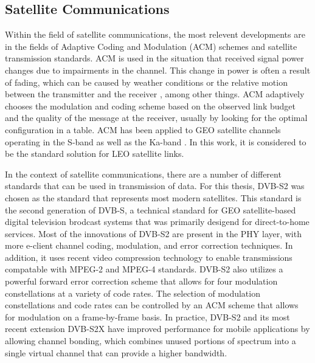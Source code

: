 \subsection{Satellite Communications}
\par Within the field of satellite communications, the most relevent developments are in the fields of Adaptive Coding and Modulation (ACM) schemes and satellite transmission standards.  ACM is used in the situation that received signal power changes due to impairments in the channel\cite{acm_explained}. This change in power is often a result of fading, which can be caused by weather conditions or the relative motion between the transmitter and the receiver \cite{paulo17}, among other things. ACM adaptively chooses the modulation and coding scheme based on the observed link budget and the quality of the message at the receiver, usually by looking for the optimal configuration in a table. ACM has been applied to GEO satellite channels operating in the S-band \cite{paulo18} as well as the Ka-band \cite{paulo19}. In this work, it is considered to be the standard solution for LEO satellite links.  
\par In the context of satellite communications, there are a number of different standards that can be used in transmission of data. For this thesis, DVB-S2 \cite{paulo21} was chosen as the standard that represents most modern satellites. This standard is the second generation of DVB-S, a technical standard for GEO satellite-based digital television brodcast systems that was primarily desigend for direct-to-home services. Most of the innovations of DVB-S2 are present in the PHY layer, with more e-client channel coding, modulation, and error correction techniques. In addition, it uses recent video compression technology to enable transmissions compatable with MPEG-2 and MPEG-4 standards. DVB-S2 also utilizes a powerful forward error correction scheme that allows for four modulation constellations at a variety of code rates. The selection of modulation constellations and code rates can be controlled by an ACM scheme that allows for modulation on a frame-by-frame basis. In practice, DVB-S2 and its most recent extension DVB-S2X \cite{paulo22} have improved performance for mobile applications by allowing channel bonding, which combines unused portions of spectrum into a single virtual channel that can provide a higher bandwidth.
